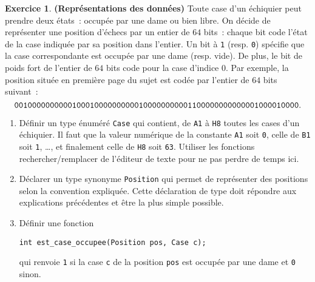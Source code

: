 \documentclass[11pt]{article}
\theoremstyle{definition}
\newtheorem{Exercice}{Exercice}
\begin{document}
\begin{Exercice} {\bf (Représentations des données)}
Toute case d'un échiquier peut prendre deux états~: occupée par une dame
ou bien libre. On décide de représenter une position d'échecs par un entier
de $64$ bits~: chaque bit code l'état de la case indiquée par sa position
dans l'entier. Un bit à {\tt 1} (resp. {\tt 0}) spécifie que la case
correspondante est occupée par une dame (resp. vide). De plus, le bit de
poids fort de l'entier de $64$ bits code pour la case d'indice $0$. Par
exemple, la position située en première page du sujet est codée par
l'entier de $64$ bits suivant~:
\begin{equation*}
{\tt 00100000 00000100 01000000 00001000 00000001 10000000 00000010 00010000}.
\end{equation*}

\begin{enumerate}
    \item Définir un type énuméré {\tt Case} qui contient, de {\tt A1} à
    {\tt H8} toutes les cases d'un échiquier. Il faut que la valeur
    numérique de la constante {\tt A1} soit {\tt 0}, celle de {\tt B1}
    soit {\tt 1}, \dots, et finalement celle de {\tt H8} soit {\tt 63}.
    Utiliser les fonctions rechercher/remplacer de l'éditeur de texte
    pour ne pas perdre de temps ici.
    \smallskip

    \item Déclarer un type synonyme {\tt Position} qui permet de
    représenter des positions selon la convention expliquée. Cette
    déclaration de type doit répondre aux explications précédentes et
    être la plus simple possible.
    \smallskip

    \item Définir une fonction
\begin{lstlisting}
int est_case_occupee(Position pos, Case c);
\end{lstlisting}
    qui renvoie {\tt 1} si la case {\tt c} de la position {\tt pos} est
    occupée par une dame et {\tt 0} sinon.
\end{enumerate}
\end{Exercice}
\bigskip
\end{document}
